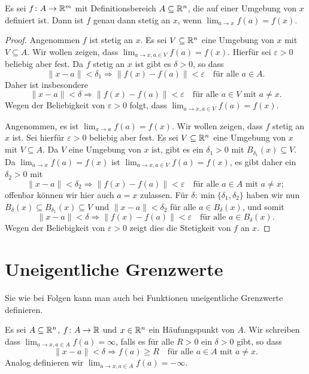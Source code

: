 \documentclass[a4paper,10pt]{article}
\begin{document}
\begin{prop}
 Es sei $f \colon A \to \mathbb{R}^m$ mit Definitionsbereich $A \subseteq \mathbb{R}^n$, die auf einer Umgebung von $x$ definiert ist. Dann ist $f$ genau dann stetig an $x$, wenn $\lim_{a \to x} f(a) = f(x)$.
\end{prop}
\begin{proof}
 Angenommen $f$ ist stetig an $x$. Es sei $V \subseteq \mathbb{R}^n$ eine Umgebung von $x$ mit $V \subseteq A$. Wir wollen zeigen, dass $\lim_{a \to x, a \in V} f(a) = f(x)$. Hierfür sei $\varepsilon > 0$ beliebig aber fest. Da $f$ stetig an $x$ ist gibt es $\delta > 0$, so dass
 \[
  \|x-a\| < \delta_1 \Rightarrow \|f(x)-f(a)\| < \varepsilon
  \quad \text{für alle $a \in A$}.
 \]
 Daher ist insbesondere
 \[
  \|x-a\| < \delta \Rightarrow \|f(x)-f(a)\| < \varepsilon
  \quad \text{für alle $a \in V$ mit $a \neq x$}.
 \]
 Wegen der Beliebigkeit von $\varepsilon > 0$ folgt, dass $\lim_{a \to x, a \in V} f(a) = f(x)$.
 
 Angenommen, es ist $\lim_{x \to a} f(a) = f(x)$. Wir wollen zeigen, dass $f$ stetig an $x$ ist. Sei hierfür $\varepsilon > 0$ beliebig aber fest. Es sei $V \subseteq \mathbb{R}^n$ eine Umgebung von $x$ mit $V \subseteq A$. Da $V$ eine Umgebung von $x$ ist, gibt es ein $\delta_1 > 0$ mit $B_{\delta_1}(x) \subseteq V$. Da $\lim_{a \to x} f(a) = f(x)$ ist $\lim_{a \to x, a \in V} f(a) = f(x)$, es gibt daher ein $\delta_2 > 0$ mit
 \[
  \|x-a\| < \delta_2 \Rightarrow \|f(x)-f(a)\| < \varepsilon
  \quad \text{für alle $a \in A$ mit $a \neq x$};
 \]
 offenbar können wir hier auch $a = x$ zulassen. Für $\delta \colon \min\{\delta_1, \delta_2\}$ haben wir nun $B_\delta(x) \subseteq B_{\delta_1}(x) \subseteq V$ und $\|x-a\| < \delta_2$ für alle $a \in B_\delta(x)$, und somit
 \[
  \|x-a\| < \delta \Rightarrow \|f(x)-f(a)\| < \varepsilon
  \quad \text{für alle $a \in B_\delta(x)$.}
 \]
 Wegen der Beliebigkeit von $\varepsilon > 0$ zeigt dies die Stetigkeit von $f$ an $x$.
\end{proof}







\section{Uneigentliche Grenzwerte}
Sie wie bei Folgen kann man auch bei Funktionen uneigentliche Grenzwerte definieren.


\begin{defi}
 Es sei $A \subseteq \mathbb{R}^n$, $f \colon A \to \mathbb{R}$ und $x \in \mathbb{R}^n$ ein Häufungspunkt von $A$. Wir schreiben dass $\lim_{a \to x, a \in A} f(a) = \infty$, falls es für alle $R > 0$ ein $\delta > 0$ gibt, so dass
 \[
  \|x-a\| < \delta \Rightarrow f(a) \geq R \quad \text{für alle $a \in A$ mit $a \neq x$}.
 \]
 Analog definieren wir $\lim_{a \to x, a \in A} f(a) = -\infty.$
\end{defi}
\end{document}
